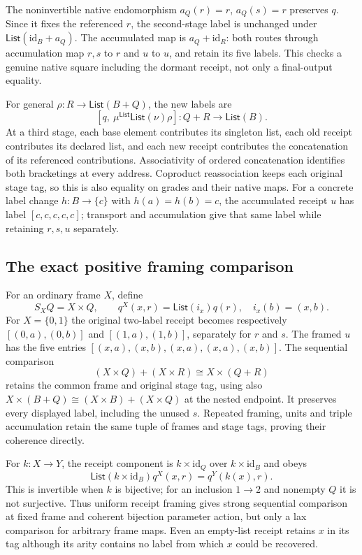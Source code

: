 \documentclass[11pt,a4paper]{article}
\theoremstyle{definition}
\newcommand{\List}{\mathsf{List}}
\newcommand{\id}{\mathrm{id}}
\begin{document}
The noninvertible native endomorphism $a_Q(r)=r$, $a_Q(s)=r$ preserves
$q$. Since it fixes the referenced $r$, the second-stage label is
unchanged under $\List(\id_B+a_Q)$. The accumulated map is
$a_Q+\id_R$: both routes through accumulation map $r,s$ to $r$ and
$u$ to $u$, and retain its five labels. This checks a genuine native
square including the dormant receipt, not only a final-output equality.

For general $\rho:R\to\List(B+Q)$, the new labels are
\[
[q,\ \mu^{\List}\List(\nu)\rho]:Q+R\longrightarrow\List(B).
\]
At a third stage, each base element contributes its singleton list, each
old receipt contributes its declared list, and each new receipt
contributes the concatenation of its referenced contributions.
Associativity of ordered concatenation identifies both bracketings at
every address. Coproduct reassociation keeps each original stage tag,
so this is also equality on grades and their native maps. For a concrete
label change $h:B\to\{c\}$ with $h(a)=h(b)=c$, the accumulated receipt
$u$ has label $[c,c,c,c,c]$; transport and accumulation give that same
label while retaining $r,s,u$ separately.

\subsection{The exact positive framing comparison}
For an ordinary frame $X$, define
\[
S_XQ=X\times Q,\qquad q^X(x,r)=\List(i_x)q(r),
\quad i_x(b)=(x,b).
\]
For $X=\{0,1\}$ the original two-label receipt becomes respectively
$[(0,a),(0,b)]$ and $[(1,a),(1,b)]$, separately for $r$ and $s$.
The framed $u$ has the five entries
$[(x,a),(x,b),(x,a),(x,a),(x,b)]$. The sequential comparison
\[
(X\times Q)+(X\times R)\cong X\times(Q+R)
\]
retains the common frame and original stage tag, using also
$X\times(B+Q)\cong(X\times B)+(X\times Q)$ at the nested endpoint.
It preserves every displayed label, including the unused $s$.
Repeated framing, units and triple accumulation retain the same tuple
of frames and stage tags, proving their coherence directly.

For $k:X\to Y$, the receipt component is $k\times\id_Q$ over
$k\times\id_B$ and obeys
\[
\List(k\times\id_B)q^X(x,r)=q^Y(k(x),r).
\]
This is invertible when $k$ is bijective; for an inclusion $1\to2$ and
nonempty $Q$ it is not surjective. Thus uniform receipt framing gives
strong sequential comparison at fixed frame and coherent bijection
parameter action, but only a lax comparison for arbitrary frame maps.
Even an empty-list receipt retains $x$ in its tag although its arity
contains no label from which $x$ could be recovered.
\end{document}
